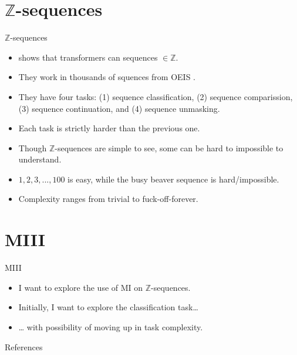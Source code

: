 \documentclass[aspectratio=32]{beamer}
\providecommand{\tightlist}{\setlength{\itemsep}{0pt}\setlength{\parskip}{0pt}}
\begin{document}
  \section{\texorpdfstring{\textbar{} \(\mathbb{Z}\)-sequences}{\textbar{} \textbackslash mathbb\{Z\}-sequences}}\label{mathbbz-sequences}

  \begin{frame}[allowframebreaks]{\textbar{} \(\mathbb{Z}\)-sequences}
  \begin{itemize}
  \tightlist
  \item
    \textcite{belcak2022} shows that transformers can sequences
    \(\in\mathbb{Z}\).
  \item
    They work in thousands of squences from OEIS \autocite{sloane2003}.
  \item
    They have four tasks: (1) sequence classification, (2) sequence
    comparission, (3) sequence continuation, and (4) sequence unmasking.
  \item
    Each task is strictly harder than the previous one.
  \end{itemize}

  \framebreak

  \begin{itemize}
  \tightlist
  \item
    Though \(\mathbb{Z}\)-sequences are simple to see, some can be hard
    to impossible to understand.
  \item
    \(1, 2, 3, ..., 100\) is easy, while the busy beaver sequence
    \autocite{aaronson2020} is hard/impossible.
  \item
    Complexity ranges from trivial to fuck-off-forever.
  \end{itemize}
  \end{frame}

  \section{\textbar{} MIII}\label{miii}

  \begin{frame}[allowframebreaks]{\textbar{} MIII}
  \begin{itemize}
  \tightlist
  \item
    I want to explore the use of MI on \(\mathbb{Z}\)-sequences.
  \item
    Initially, I want to explore the classification task\ldots{}
  \item
    \ldots{} with possibility of moving up in task complexity.
  \end{itemize}
  \end{frame}

  
\begin{frame}[allowframebreaks]
  \Large{References}
  \small\linespread{1.2}\printbibliography
\end{frame}
\end{document}

